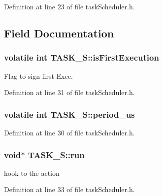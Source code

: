 Definition at line 23 of file task\-Scheduler.\-h.



\subsection{Field Documentation}
\hypertarget{structTASK__S_a4b50404ee955691f1c62845cdc9de676}{
\subsubsection[{is\-First\-Execution}]{\setlength{\rightskip}{0pt plus 5cm}volatile int T\-A\-S\-K\-\_\-\-S\-::is\-First\-Execution}}\label{structTASK__S_a4b50404ee955691f1c62845cdc9de676}


Flag to sign first Exec. 



Definition at line 31 of file task\-Scheduler.\-h.

\hypertarget{structTASK__S_aabd8f80831e6cfd8e51bbd371eed907b}{
\subsubsection[{period\-\_\-us}]{\setlength{\rightskip}{0pt plus 5cm}volatile int T\-A\-S\-K\-\_\-\-S\-::period\-\_\-us}}\label{structTASK__S_aabd8f80831e6cfd8e51bbd371eed907b}


Definition at line 30 of file task\-Scheduler.\-h.

\hypertarget{structTASK__S_abe9c219d2f60c43991788786735599f2}{
\subsubsection[{run}]{\setlength{\rightskip}{0pt plus 5cm}void$\ast$ T\-A\-S\-K\-\_\-\-S\-::run}}\label{structTASK__S_abe9c219d2f60c43991788786735599f2}


hook to the action 



Definition at line 33 of file task\-Scheduler.\-h.




